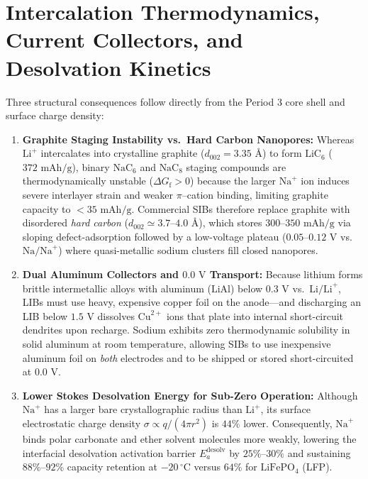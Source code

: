 \documentclass[11pt]{article}
\begin{document}
\section{Intercalation Thermodynamics, Current Collectors, and Desolvation Kinetics}
\label{sec:intercalation-kinetics}
Three structural consequences follow directly from the Period 3 core shell and surface charge density:
\begin{enumerate}[label=\arabic*.]
\item \textbf{Graphite Staging Instability vs.\ Hard Carbon Nanopores:} Whereas $\text{Li}^+$ intercalates into crystalline graphite ($d_{002} = 3.35\text{ \AA}$) to form $\text{LiC}_6$ ($372\text{ mAh/g}$), binary $\text{NaC}_6$ and $\text{NaC}_8$ staging compounds are thermodynamically unstable ($\Delta G_{\text{f}} > 0$) because the larger $\text{Na}^+$ ion induces severe interlayer strain and weaker $\pi$--cation binding, limiting graphite capacity to $< 35\text{ mAh/g}$. Commercial SIBs therefore replace graphite with disordered \textit{hard carbon} ($d_{002} \simeq 3.7$--$4.0\text{ \AA}$), which stores $300$--$350\text{ mAh/g}$ via sloping defect-adsorption followed by a low-voltage plateau ($0.05$--$0.12\text{ V}$ vs.\ $\text{Na/Na}^+$) where quasi-metallic sodium clusters fill closed nanopores.
\item \textbf{Dual Aluminum Collectors and $0.0\text{ V}$ Transport:} Because lithium forms brittle intermetallic alloys with aluminum ($\text{LiAl}$) below $0.3\text{ V}$ vs.\ $\text{Li/Li}^+$, LIBs must use heavy, expensive copper foil on the anode---and discharging an LIB below $1.5\text{ V}$ dissolves $\text{Cu}^{2+}$ ions that plate into internal short-circuit dendrites upon recharge. Sodium exhibits zero thermodynamic solubility in solid aluminum at room temperature, allowing SIBs to use inexpensive aluminum foil on \textit{both} electrodes and to be shipped or stored short-circuited at $0.0\text{ V}$.
\item \textbf{Lower Stokes Desolvation Energy for Sub-Zero Operation:} Although $\text{Na}^+$ has a larger bare crystallographic radius than $\text{Li}^+$, its surface electrostatic charge density $\sigma \propto q / (4\pi r^2)$ is $44\%$ lower. Consequently, $\text{Na}^+$ binds polar carbonate and ether solvent molecules more weakly, lowering the interfacial desolvation activation barrier $E_a^{\text{desolv}}$ by $25\%$--$30\%$ and sustaining $88\%$--$92\%$ capacity retention at $-20\,^\circ\text{C}$ versus $64\%$ for $\text{LiFePO}_4$ (LFP).
\end{enumerate}
\end{document}
